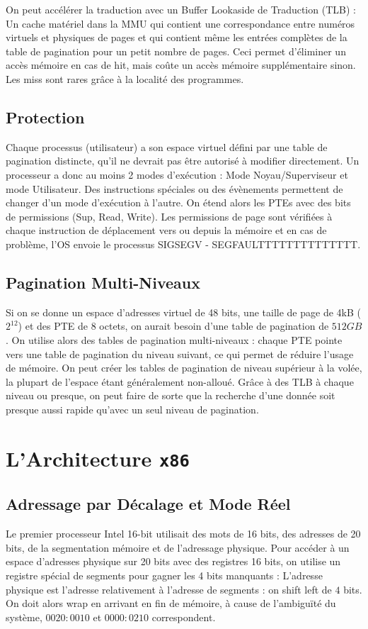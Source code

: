 \documentclass{cours}
\begin{document}
On peut accélérer la traduction avec un Buffer Lookaside de Traduction (TLB) : Un cache matériel dans la MMU qui contient une correspondance entre numéros virtuels et physiques de pages et qui contient même les entrées complètes de la table de pagination pour un petit nombre de pages. 
Ceci permet d'éliminer un accès mémoire en cas de hit, mais coûte un accès mémoire supplémentaire sinon. Les miss sont rares grâce à la localité des programmes.

\subsection{Protection}
Chaque processus (utilisateur) a son espace virtuel défini par une table de pagination distincte, qu'il ne devrait pas être autorisé à modifier directement. 
Un processeur a donc au moins 2 modes d'exécution : Mode Noyau/Superviseur et mode Utilisateur. Des instructions spéciales ou des évènements permettent de changer d'un mode d'exécution à l'autre. 
On étend alors les PTEs avec des bits de permissions (Sup, Read, Write). Les permissions de page sont vérifiées à chaque instruction de déplacement vers ou depuis la mémoire et en cas de problème, l'OS envoie le processus SIGSEGV - SEGFAULTTTTTTTTTTTTTT.

\subsection{Pagination Multi-Niveaux}
Si on se donne un espace d'adresses virtuel de 48 bits, une taille de page de 4kB ($2^{12}$) et des PTE de 8 octets, on aurait besoin d'une table de pagination de $512 GB$. 
On utilise alors des tables de pagination multi-niveaux : chaque PTE pointe vers une table de pagination du niveau suivant, ce qui permet de réduire l'usage de mémoire. On peut créer les tables de pagination de niveau supérieur à la volée, la plupart de l'espace étant généralement non-alloué. 
Grâce à des TLB à chaque niveau ou presque, on peut faire de sorte que la recherche d'une donnée soit presque aussi rapide qu'avec un seul niveau de pagination. 

\section{L'Architecture \tt x86}
\subsection{Adressage par Décalage et Mode Réel}
Le premier processeur Intel 16-bit utilisait des mots de 16 bits, des adresses de 20 bits, de la segmentation mémoire et de l'adressage physique. 
Pour accéder à un espace d'adresses physique sur 20 bits avec des registres 16 bits, on utilise un registre spécial de segments pour gagner les 4 bits manquants : L'adresse physique est l'adresse relativement à l'adresse de segments : on shift left de $4$ bits. 
On doit alors wrap en arrivant en fin de mémoire, à cause de l'ambiguïté du système, $0020:0010$ et $0000:0210$ correspondent. 
\end{document}

